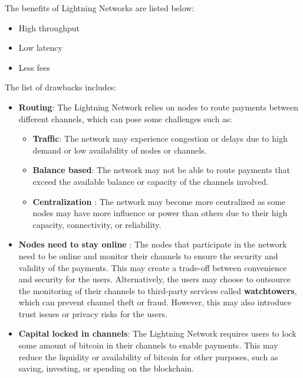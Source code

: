 The benefits of Lightning Networks are listed below:
\begin{itemize}
	\item High throughput
	\item Low latency
	\item Less fees
\end{itemize}
The list of drawbacks includes:
\begin{itemize}
	\item \textbf{Routing}: The Lightning Network relies on nodes to route payments between different channels, which can pose some challenges such as:
	\begin{itemize}
		\item \textbf{Traffic}: The network may experience congestion or delays due to high demand or low availability of nodes or channels.
		\item \textbf{Balance based}: The network may not be able to route payments that exceed the available balance or capacity of the channels involved.
		\item \textbf{Centralization} : The network may become more centralized as some nodes may have more influence or power than others due to their high capacity, connectivity, or reliability.
	\end{itemize}
	\item \textbf{Nodes need to stay online} : The nodes that participate in the network need to be online and monitor their channels to ensure the security and validity of the payments. This may create a trade-off between convenience and security for the users. Alternatively, the users may choose to outsource the monitoring of their channels to third-party services called \textbf{watchtowers}, which can prevent channel theft or fraud. However, this may also introduce trust issues or privacy risks for the users.
	\item \textbf{Capital locked in channels}: The Lightning Network requires users to lock some amount of bitcoin in their channels to enable payments. This may reduce the liquidity or availability of bitcoin for other purposes, such as saving, investing, or spending on the blockchain.
\end{itemize}